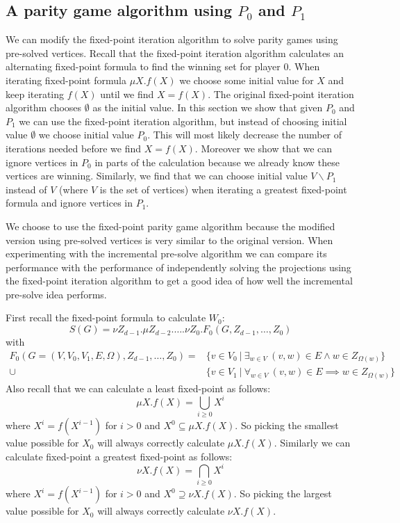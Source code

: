 \subsection{A parity game algorithm using $P_0$ and $P_1$}
We can modify the fixed-point iteration algorithm to solve parity games using pre-solved vertices. Recall that the fixed-point iteration algorithm calculates an alternating fixed-point formula to find the winning set for player 0. When iterating fixed-point formula $\mu X.f(X)$ we choose some initial value for $X$ and keep iterating $f(X)$ until we find $X = f(X)$. The original fixed-point iteration algorithm chooses $\emptyset$ as the initial value. In this section we show that given $P_0$ and $P_1$ we can use the fixed-point iteration algorithm, but instead of choosing initial value $\emptyset$ we choose initial value $P_0$. This will most likely decrease the number of iterations needed before we find $X = f(X)$. Moreover we show that we can ignore vertices in $P_0$ in parts of the calculation because we already know these vertices are winning. Similarly, we find that we can choose initial value $V\backslash P_1$ instead of $V$ (where $V$ is the set of vertices) when iterating a greatest fixed-point formula and ignore vertices in $P_1$.

We choose to use the fixed-point parity game algorithm because the modified version using pre-solved vertices is very similar to the original version. When experimenting with the incremental pre-solve algorithm we can compare its performance with the performance of independently solving the projections using the fixed-point iteration algorithm to get a good idea of how well the incremental pre-solve idea performs.

First recall the fixed-point formula to calculate $W_0$:
\[ S(G) = \nu Z_{d-1}. \mu Z_{d-2}. \dots . \nu Z_0. F_0(G,Z_{d-1},\dots,Z_0) \]
with
\begin{align*}
	F_0(G = (V,V_0,V_1,E,\Omega),Z_{d-1},\dots,Z_0) = &\{ v \in V_0\ |\ \exists_{w\in V}\ (v,w) \in E \wedge w\in Z_{\Omega(w)} \}\\
	\cup &\{ v \in V_1\ |\ \forall_{w\in V}\ (v,w) \in E \implies w\in Z_{\Omega(w)} \}
\end{align*}
Also recall that we can calculate a least fixed-point as follows:
\[ \mu X.f(X) = \bigcup_{i \geq 0} X^i \]
where $X^i = f(X^{i-1})$ for $i > 0$ and $X^0 \subseteq \mu X.f(X)$. So picking the smallest value possible for $X_0$ will always correctly calculate $\mu X. f(X)$.
Similarly we can calculate fixed-point a greatest fixed-point as follows:
\[ \nu X.f(X) = \bigcap_{i \geq 0} X^i \]
where $X^i = f(X^{i-1})$ for $i > 0$ and $X^0 \supseteq \nu X.f(X)$. So picking the largest value possible for $X_0$ will always correctly calculate $\nu X. f(X)$.

